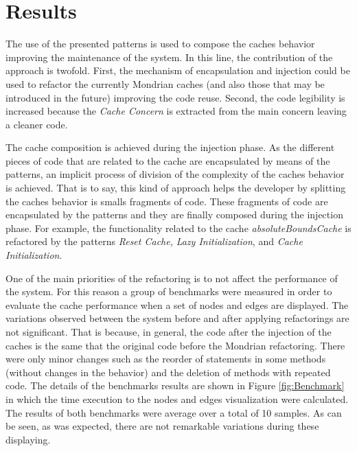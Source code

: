 \documentclass[preprint,10pt]{sigplanconf}
\newcommand{\seclabel}[1]{\label{sec:#1}}
\begin{document}
\section{Results}\seclabel{results}

The use of the presented patterns is used to compose the caches
behavior improving the maintenance of the system. In this line, the
contribution of the approach is twofold. First, the mechanism of encapsulation
and injection could be used to refactor the currently Mondrian caches
(and also those that may be introduced in the future) improving the code
reuse. Second, the code legibility is increased because the \emph{Cache
Concern} is extracted from the main concern leaving a cleaner code.

The cache composition is achieved during the injection phase. As the
different pieces of code that are related to the cache are encapsulated
by means of the patterns, an implicit process of division of the complexity
of the caches behavior is achieved. That is to say, this kind of approach
helps the developer by splitting the caches behavior is smalls fragments
of code. These fragments of code are encapsulated by the patterns
and they are finally composed during the injection phase. For example,
the functionality related to the cache \emph{absoluteBoundsCache}
is refactored by the patterns \emph{Reset Cache,} \emph{Lazy Initialization}, and \emph{Cache Initialization}.

One of the main priorities of the refactoring is to not affect the performance of the system. 
For this reason a group of benchmarks were measured in order to evaluate the cache performance when a set of nodes and edges are displayed. The variations observed between the system before and after applying refactorings are not significant. That is because, in general, the code after the injection of the caches is the same that the original code before the Mondrian refactoring. There were only minor changes such as the reorder of statements in some methods (without changes in the behavior) and the deletion of methods with repeated code. The details of the benchmarks results are shown in Figure \ref{fig:Benchmark} in which the time execution to the nodes and edges visualization were calculated. The results of both benchmarks were average over a total of 10 samples. As can be seen, as was expected, there are not remarkable variations during these displaying.
\end{document}
